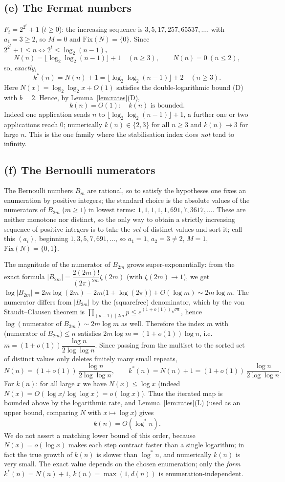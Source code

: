 \documentclass[12pt]{article}
\theoremstyle{definition}
\begin{document}
\subsection{(e) The Fermat numbers}
$F_t=2^{2^t}+1$ ($t\ge0$): the increasing sequence is $3,5,17,257,65537,\dots$, with
$a_1=3\ge2$, so $M=0$ and $\mathrm{Fix}(N)=\{0\}$. Since $2^{2^t}+1\le n\iff
2^t\le\log_2(n-1)$,
\[
  N(n)=\bigl\lfloor\log_2\log_2(n-1)\bigr\rfloor+1\quad(n\ge3),\qquad N(n)=0\ (n\le2),
\]
so, \emph{exactly},
\[
  k^*(n)=N(n)+1=\bigl\lfloor\log_2\log_2(n-1)\bigr\rfloor+2\quad(n\ge3).
\]
Here $N(x)=\log_2\log_2 x+O(1)$ satisfies the double-logarithmic bound (D) with
$b=2$. Hence, by Lemma~\ref{lem:rates}(D),
\[
  k(n)=O(1):\quad\text{$k(n)$ is bounded.}
\]
Indeed one application sends $n$ to $\lfloor\log_2\log_2(n-1)\rfloor+1$, a further one
or two applications reach $0$; numerically $k(n)\in\{2,3\}$ for all $n\ge3$ and
$k(n)\to 3$ for large $n$. This is the one family where the stabilisation index does
\emph{not} tend to infinity.

\subsection{(f) The Bernoulli numerators}
The Bernoulli numbers $B_m$ are rational, so to satisfy the hypotheses one fixes an
enumeration by positive integers; the standard choice is the absolute values of the
numerators of $B_{2m}$ ($m\ge1$) in lowest terms:
$1,1,1,1,1,691,7,3617,\dots$. These are neither monotone nor distinct, so the only
way to obtain a strictly increasing sequence of positive integers is to take the
\emph{set} of distinct values and sort it; call this $(a_i)$, beginning
$1,3,5,7,691,\dots$, so $a_1=1$, $a_2=3\ne2$, $M=1$, $\mathrm{Fix}(N)=\{0,1\}$.

The magnitude of the numerator of $B_{2m}$ grows super-exponentially: from the exact
formula $|B_{2m}|=\dfrac{2(2m)!}{(2\pi)^{2m}}\zeta(2m)$ (with $\zeta(2m)\to1$), we get
$\log|B_{2m}|=2m\log(2m)-2m\bigl(1+\log(2\pi)\bigr)+O(\log m)\sim 2m\log m$. The
numerator differs from $|B_{2m}|$ by the (squarefree) denominator, which by the von
Staudt--Clausen theorem is $\prod_{(p-1)\mid 2m}p\le e^{(1+o(1))\sqrt{m}}$, hence
$\log(\text{numerator of }B_{2m})\sim 2m\log m$ as well. Therefore the index $m$ with
(numerator of $B_{2m})\le n$ satisfies $2m\log m=(1+o(1))\log n$, i.e.
$m=(1+o(1))\dfrac{\log n}{2\log\log n}$. Since passing from the multiset to the sorted
set of distinct values only deletes finitely many small repeats,
\[
  N(n)=(1+o(1))\,\frac{\log n}{2\log\log n},\qquad
  k^*(n)=N(n)+1=(1+o(1))\,\frac{\log n}{2\log\log n}.
\]
For $k(n)$: for all large $x$ we have $N(x)\le\log x$ (indeed
$N(x)=O(\log x/\log\log x)=o(\log x)$). Thus the iterated map is bounded above by the
logarithmic rate, and Lemma~\ref{lem:rates}(L) (used as an upper bound, comparing $N$
with $x\mapsto\log x$) gives
\[
  k(n)=O(\log^* n).
\]
We do not assert a matching lower bound of this order, because $N(x)=o(\log x)$ makes
each step contract faster than a single logarithm; in fact the true growth of $k(n)$
is slower than $\log^* n$, and numerically $k(n)$ is very small. The exact value depends on the chosen
enumeration; only the \emph{form} $k^*(n)=N(n)+1$, $k(n)=\max(1,d(n))$ is
enumeration-independent.
\end{document}
